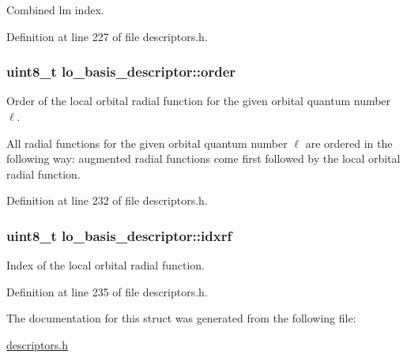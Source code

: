 Combined lm index. 



Definition at line 227 of file descriptors.\+h.

\hypertarget{structlo__basis__descriptor_a9f026acaa1e897a60c2c8d3956aae6ca}{}
\subsubsection[{order}]{\setlength{\rightskip}{0pt plus 5cm}uint8\+\_\+t lo\+\_\+basis\+\_\+descriptor\+::order}\label{structlo__basis__descriptor_a9f026acaa1e897a60c2c8d3956aae6ca}


Order of the local orbital radial function for the given orbital quantum number $ \ell $. 

All radial functions for the given orbital quantum number $ \ell $ are ordered in the following way\+: augmented radial functions come first followed by the local orbital radial function. 

Definition at line 232 of file descriptors.\+h.

\hypertarget{structlo__basis__descriptor_aef20fdb76c57632a87ee216a121af342}{}
\subsubsection[{idxrf}]{\setlength{\rightskip}{0pt plus 5cm}uint8\+\_\+t lo\+\_\+basis\+\_\+descriptor\+::idxrf}\label{structlo__basis__descriptor_aef20fdb76c57632a87ee216a121af342}


Index of the local orbital radial function. 



Definition at line 235 of file descriptors.\+h.



The documentation for this struct was generated from the following file\+:\begin{DoxyCompactItemize}
\item 
\hyperlink{descriptors_8h}{descriptors.\+h}\end{DoxyCompactItemize}
